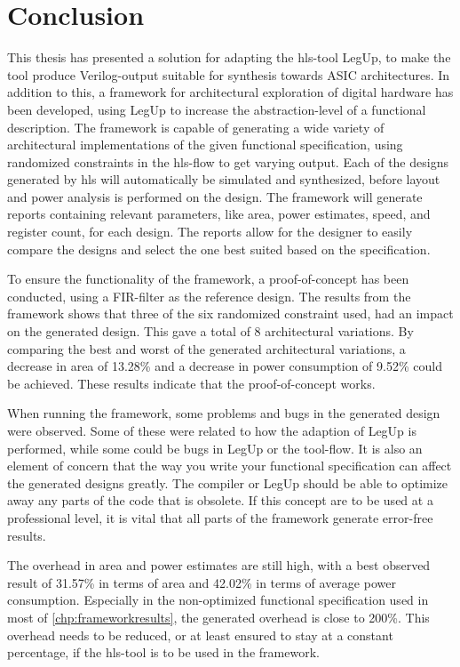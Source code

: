 \chapter{Conclusion}
\label{chp:conclusion} 
This thesis has presented a solution for adapting the \gls{hls}-tool LegUp, to make the tool produce Verilog-output suitable for synthesis towards ASIC architectures. In addition to this, a framework for architectural exploration of digital hardware has been developed, using LegUp to increase the abstraction-level of a functional description. The framework is capable of generating a wide variety of architectural implementations of the given functional specification, using randomized constraints in the \gls{hls}-flow to get varying output. Each of the designs generated by \gls{hls} will automatically be simulated and synthesized, before layout and power analysis is performed on the design. The framework will generate reports containing relevant parameters, like area, power estimates, speed, and register count, for each design. The reports allow for the designer to easily compare the designs and select the one best suited based on the specification.

To ensure the functionality of the framework, a proof-of-concept has been conducted, using a FIR-filter as the reference design. The results from the framework shows that three of the six randomized constraint used, had an impact on the generated design. This gave a total of 8 architectural variations. By comparing the best and worst of the generated architectural variations, a decrease in area of 13.28\% and a decrease in power consumption of 9.52\% could be achieved. These results indicate that the proof-of-concept works.

When running the framework, some problems and bugs in the generated design were observed. Some of these were related to how the adaption of LegUp is performed, while some could be bugs in LegUp or the tool-flow. It is also an element of concern that the way you write your functional specification can affect the generated designs greatly. The compiler or LegUp should be able to optimize away any parts of the code that is obsolete. If this concept are to be used at a professional level, it is vital that all parts of the framework generate error-free results. 

The overhead in area and power estimates are still high, with a best observed result of 31.57\% in terms of area and 42.02\% in terms of average power consumption. Especially in the non-optimized functional specification used in most of \cref{chp:frameworkresults}, the generated overhead is close to 200\%. This overhead needs to be reduced, or at least ensured to stay at a constant percentage, if the \gls{hls}-tool is to be used in the framework.

